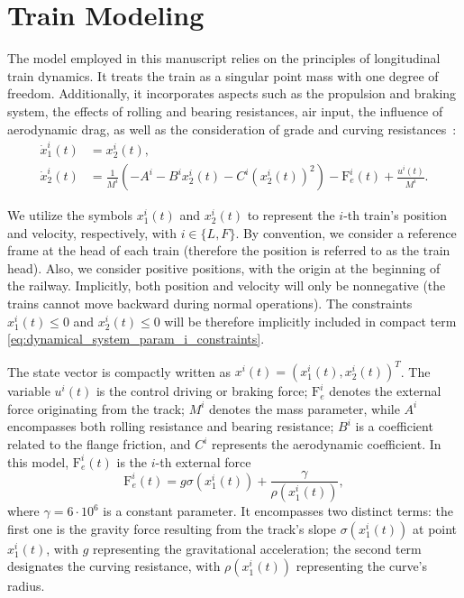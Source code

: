 \documentclass[letterpaper, 10 pt, conference]{ieeeconf}
\theoremstyle{definition}
\theoremstyle{nopoint}
\begin{document}
 \section{Train Modeling}
 \label{sec:TrainModeling}

The model employed in this manuscript relies on the principles of longitudinal train dynamics. It treats the train as a singular point mass with one degree of freedom. Additionally, it incorporates aspects such as the propulsion and braking system, the effects of rolling and bearing resistances, air input, the influence of aerodynamic drag, as well as the consideration of grade and curving resistances~\cite{ltdModel}:
%
  \begin{align}  \label{eq:stateDynamic}
 \dot{x}_1^i (t) &= x_2^i(t),  \nonumber \\
  \dot{x}_2^i(t) &= \frac{1}{M^i}(-A^i-B^i x_2^i(t) -  C^i (x_2^i(t))^2)-\mathrm{F}_e^i(t) + \frac{u^i(t)}{M^i}.
\end{align}
%

We utilize the symbols ${x}_1^i(t)$ and ${x}_2^i(t)$ to represent the $i$-th train's position and velocity, respectively, with $i\in\{L, F\}$. By convention, we consider a reference frame at the head of each train (therefore the position is referred to as the train head). 
Also, we consider positive positions, with the origin at the beginning of the railway. Implicitly, both position and velocity will only be nonnegative (the trains cannot move backward during normal operations). The constraints ${x}_1^i(t)\leq 0$ and ${x}_2^i(t)\leq 0$ will be therefore implicitly included in compact term \eqref{eq:dynamical_system_param_i_constraints}.
 
The state vector is compactly written as {$x^i(t)=(x_1^i(t),x_2^i(t))^T$}.
The variable $u^i(t)$ is the control driving or braking force; $\mathrm{F}_e^i$ denotes the external force originating from the track; $M^i$ denotes the mass parameter, while $A^i$ encompasses both rolling resistance and bearing resistance; $B^i$ is a coefficient related to the flange friction, and $C^i$ represents the aerodynamic coefficient.
%
In this model, $\mathrm{F}^i_e(t)$ is the $i$-th external force
%
\begin{equation*}
\mathrm{F}_e^i(t) = g \sigma(x_1^i(t)) + \frac{\gamma}{\rho(x_1^i(t))}, 
\end{equation*}
%
where $\gamma=6\cdot10^6$ is a constant parameter. It encompasses two distinct terms: the first one is the gravity force resulting from the track's slope $\sigma(x_1^i(t))$  at point $x_1^i(t)$, with $g$ representing the gravitational acceleration; the second term designates the curving resistance, with ${\rho(x_1^i(t))}$ representing the curve's radius.
\end{document}
